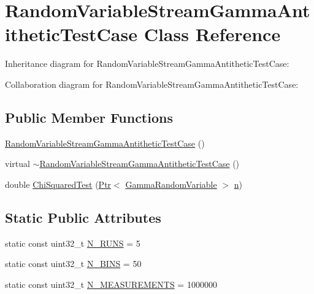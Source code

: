 \hypertarget{classRandomVariableStreamGammaAntitheticTestCase}{}\section{Random\+Variable\+Stream\+Gamma\+Antithetic\+Test\+Case Class Reference}
\label{classRandomVariableStreamGammaAntitheticTestCase}


Inheritance diagram for Random\+Variable\+Stream\+Gamma\+Antithetic\+Test\+Case\+:


Collaboration diagram for Random\+Variable\+Stream\+Gamma\+Antithetic\+Test\+Case\+:
\subsection*{Public Member Functions}
\begin{DoxyCompactItemize}
\item 
\hyperlink{classRandomVariableStreamGammaAntitheticTestCase_a2869fc5df80bcc63a838c76199240a36}{Random\+Variable\+Stream\+Gamma\+Antithetic\+Test\+Case} ()
\item 
virtual \hyperlink{classRandomVariableStreamGammaAntitheticTestCase_ad35c4254777d407f86698e6125e469e0}{$\sim$\+Random\+Variable\+Stream\+Gamma\+Antithetic\+Test\+Case} ()
\item 
double \hyperlink{classRandomVariableStreamGammaAntitheticTestCase_a51540f4a36a6c9c9fdc81f95fde0224f}{Chi\+Squared\+Test} (\hyperlink{classns3_1_1Ptr}{Ptr}$<$ \hyperlink{classns3_1_1GammaRandomVariable}{Gamma\+Random\+Variable} $>$ \hyperlink{lte__link__budget__x2__handover__measures_8m_abdb05bc5a064cf642a06c83b3392f148}{n})
\end{DoxyCompactItemize}
\subsection*{Static Public Attributes}
\begin{DoxyCompactItemize}
\item 
static const uint32\+\_\+t \hyperlink{classRandomVariableStreamGammaAntitheticTestCase_aab2dfb293b0566a23871559a28617bab}{N\+\_\+\+R\+U\+NS} = 5
\item 
static const uint32\+\_\+t \hyperlink{classRandomVariableStreamGammaAntitheticTestCase_a53782cd4dda85815c519f356800b2193}{N\+\_\+\+B\+I\+NS} = 50
\item 
static const uint32\+\_\+t \hyperlink{classRandomVariableStreamGammaAntitheticTestCase_a0b59ae69267b6ca3649f0617cf02932e}{N\+\_\+\+M\+E\+A\+S\+U\+R\+E\+M\+E\+N\+TS} = 1000000
\end{DoxyCompactItemize}
